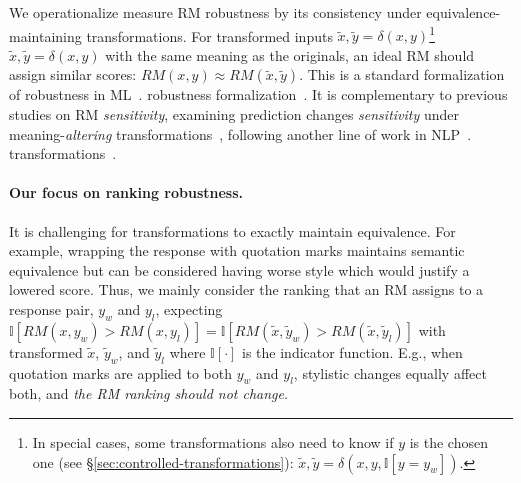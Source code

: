 We
\iflongversion
operationalize
\else
measure
\fi
RM robustness by its consistency under equivalence-maintaining transformations.
For transformed inputs
\iflongversion
$\tilde{x}, \tilde{y} = \delta(x, y)$\footnote{In special cases, some transformations also need to know if $y$ is the chosen one (see \S\ref{sec:controlled-transformations}): $\tilde{x}, \tilde{y} = \delta(x, y, \mathbb{I}[y=y_w])$.}
\else
$\tilde{x}, \tilde{y} = \delta(x, y)$
\fi
with the same meaning as the originals, an ideal RM should assign similar scores: $RM(x,y)\approx RM(\tilde{x}, \tilde{y})$.
This is a standard
\iflongversion
formalization of robustness in ML~.
\else
robustness formalization~\citep{42503,43405,8424625}.
\fi
It is complementary to previous studies on RM
\iflongversion
\emph{sensitivity}, examining prediction changes
\else
\emph{sensitivity}
\fi
under meaning-\emph{altering}
\iflongversion
transformations~\citep{shen2024the}, following another line of work in NLP~.
\else
transformations~\citep{shen2024the}.
\fi

\paragraph{Our focus on ranking robustness.}
It is challenging for transformations to exactly maintain equivalence. For example, wrapping the response with quotation marks maintains semantic equivalence but can be considered having worse style which would justify a lowered score.
Thus, we mainly consider the ranking that an RM assigns to a response pair, $y_w$ and $y_l$, expecting $\mathbb{I}[RM(x,y_w)>RM(x,y_l)]=\mathbb{I}[RM(\tilde{x},\tilde{y}_w)>RM(\tilde{x},\tilde{y}_l)]$ with transformed $\tilde{x}$, $\tilde{y}_w$, and $\tilde{y}_l$ where $\mathbb{I}[\cdot]$ is the indicator function.
E.g., when quotation marks are applied to both $y_w$ and $y_l$, stylistic changes equally affect both, and \emph{the RM ranking should not change}.
